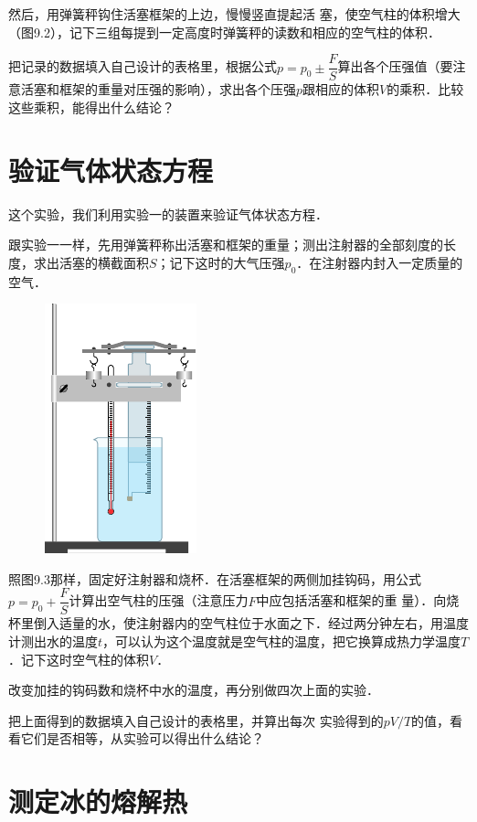 然后，用弹簧秤钩住活塞框架的上边，慢慢竖直提起活
塞，使空气柱的体积增大（图9.2），记下三组每提到一定高度时弹簧秤的读数和相应的空气柱的体积．

把记录的数据填入自己设计的表格里，根据公式$p=p_0\pm \dfrac{F}{S}$算出各个压强值（要注意活塞和框架的重量对压强的影响），求出各个压强$p$跟相应的体积$V$的乘积．比较这些乘积，能得出什么结论？

\section{验证气体状态方程}
这个实验，我们利用实验一的装置来验证气体状态方程．

跟实验一一样，先用弹簧秤称出活塞和框架的重量；测出注射器的全部刻度的长度，求出活塞的横截面积$S$；记下这时的大气压强$p_0$．在注射器内封入一定质量的空气．
\begin{figure}[htbp]
    \centering
    \includegraphics{fig/B/9-3.pdf}
    \caption{}\label{fig_B_9-3}
\end{figure}

照图9.3那样，固定好注射器和烧杯．在活塞框架的两侧加挂钩码，用公式$p=p_0+ \dfrac{F}{S}$计算出空气柱的压强（注意压力$F$中应包括活塞和框架的重
量）．向烧杯里倒入适量的水，使注射器内的空气柱位于水面之下．经过两分钟左右，用温度计测出水的温度$t$，可以认为这个温度就是空气柱的温度，把它换算成热力学温度$T$．记下这时空气柱的体积$V$．

改变加挂的钩码数和烧杯中水的温度，再分别做四次上面的实验．

把上面得到的数据填入自己设计的表格里，并算出每次
实验得到的$pV/T$的值，看看它们是否相等，从实验可以得出什么结论？

\section{测定冰的熔解热}

